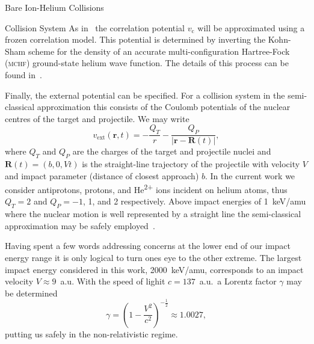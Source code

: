 \documentclass[letterpaper, 11 pt]{report}
\begin{document}
\begin{chapter}{Bare Ion-Helium Collisions \label{chap:p-he2p-he}}
\begin{section}{Collision System \label{sec:p-he2p-he-sys}}
      As in~\cite{pbarhe} the correlation potential $v_\mathrm{c}$ will be approximated using a frozen
      correlation model. This potential is determined by inverting the Kohn-Sham scheme for the density
      of an accurate multi-configuration Hartree-Fock~\cite{mchf} (\textsc{mchf}) ground-state helium
      wave function. The details of this process can be found in~\cite{thesis, pbarhe}.

      Finally, the external potential can be specified. For a collision system in the semi-classical
      approximation this consists of the Coulomb potentials of the nuclear centres of the target and
      projectile. We may write
      \begin{equation} \label{eq:phe2p-ext}
         v_\mathrm{ext}(\mathbf{r},t) = -\frac{Q_T}{r}
         - \frac{Q_P}{\left| \mathbf{r} - \mathbf{R}(t) \right|},
      \end{equation}
      where $Q_T$ and $Q_P$ are the charges of the target and projectile nuclei and
      $\mathbf{R}(t) = (b,0,V t)$ is the straight-line trajectory of the projectile with velocity $V$ and
      impact parameter (distance of closest approach) $b$. In the current work we consider antiprotons,
      protons, and He\textsuperscript{2+} ions incident on helium atoms, thus $Q_T = 2$ and
      $Q_P = -1$, 1, and 2 respectively. Above impact energies of 1~keV/amu where the nuclear motion is
      well represented by a straight line the semi-classical approximation may be safely
      employed~\cite{bgm-rev}.

      Having spent a few words addressing concerns at the lower end of our impact energy range it is
      only logical to turn ones eye to the other extreme. The largest impact energy considered in this
      work, 2000~keV/amu, corresponds to an impact velocity $V \approx 9$~a.u. With the speed of lighit
      $c = 137$~a.u.\ a Lorentz factor $\gamma$ may be determined
      \begin{equation} \label{eq:lorentz}
         \gamma = \left( 1 - \frac{V^2}{c^2} \right)^{-\frac{1}{2}} \approx 1.0027,
      \end{equation}
      putting us safely in the non-relativistic regime.


\end{section}
\end{chapter}
\end{document}
